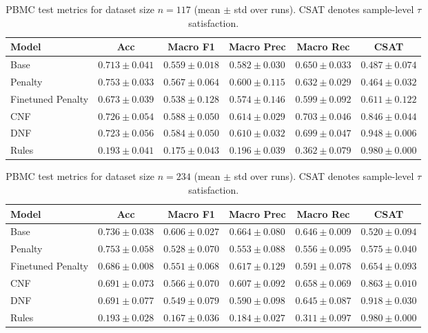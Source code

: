 \documentclass{article}
\theoremstyle{plain}
\theoremstyle{definition}
\theoremstyle{remark}
\begin{document}
\begin{table}[h]
\centering
\small
\begin{tabular}{lccccc}
\toprule
Model & Acc & Macro F1 & Macro Prec & Macro Rec & CSAT \\
\midrule
Base                         & $0.713 \pm 0.041$ & $0.559 \pm 0.018$ & $0.582 \pm 0.030$ & $0.650 \pm 0.033$ & $0.487 \pm 0.074$ \\
Penalty            & $0.753 \pm 0.033$ & $0.567 \pm 0.064$ & $0.600 \pm 0.115$ & $0.632 \pm 0.029$ & $0.464 \pm 0.032$ \\
Finetuned Penalty   & $0.673 \pm 0.039$ & $0.538 \pm 0.128$ & $0.574 \pm 0.146$ & $0.599 \pm 0.092$ & $0.611 \pm 0.122$ \\
CNF                & $0.726 \pm 0.054$ & $0.588 \pm 0.050$ & $0.614 \pm 0.029$ & $0.703 \pm 0.046$ & $0.846 \pm 0.044$ \\
DNF                & $0.723 \pm 0.056$ & $0.584 \pm 0.050$ & $0.610 \pm 0.032$ & $0.699 \pm 0.047$ & $0.948 \pm 0.006$ \\
Rules               & $0.193 \pm 0.041$ & $0.175 \pm 0.043$ & $0.196 \pm 0.039$ & $0.362 \pm 0.079$ & $0.980 \pm 0.000$ \\
\bottomrule
\end{tabular}
\caption{PBMC test metrics for dataset size $n=117$ (mean $\pm$ std over runs). CSAT denotes sample-level $\tau$ satisfaction.}
\label{tab:pbmc_test_n117}
\end{table}

\begin{table}[h]
\centering
\small
\begin{tabular}{lccccc}
\toprule
Model & Acc & Macro F1 & Macro Prec & Macro Rec & CSAT \\
\midrule
Base                         & $0.736 \pm 0.038$ & $0.606 \pm 0.027$ & $0.664 \pm 0.080$ & $0.646 \pm 0.009$ & $0.520 \pm 0.094$ \\
Penalty            & $0.753 \pm 0.058$ & $0.528 \pm 0.070$ & $0.553 \pm 0.088$ & $0.556 \pm 0.095$ & $0.575 \pm 0.040$ \\
Finetuned Penalty   & $0.686 \pm 0.008$ & $0.551 \pm 0.068$ & $0.617 \pm 0.129$ & $0.591 \pm 0.078$ & $0.654 \pm 0.093$ \\
CNF                & $0.691 \pm 0.073$ & $0.566 \pm 0.070$ & $0.607 \pm 0.092$ & $0.658 \pm 0.069$ & $0.863 \pm 0.010$ \\
DNF                & $0.691 \pm 0.077$ & $0.549 \pm 0.079$ & $0.590 \pm 0.098$ & $0.645 \pm 0.087$ & $0.918 \pm 0.030$ \\
Rules               & $0.193 \pm 0.028$ & $0.167 \pm 0.036$ & $0.184 \pm 0.027$ & $0.311 \pm 0.097$ & $0.980 \pm 0.000$ \\
\bottomrule
\end{tabular}
\caption{PBMC test metrics for dataset size $n=234$ (mean $\pm$ std over runs). CSAT denotes sample-level $\tau$ satisfaction.}
\label{tab:pbmc_test_n234}
\end{table}
\end{document}
